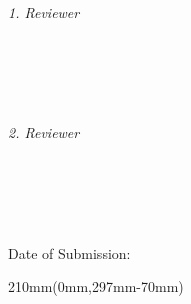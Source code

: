 \begin{titlepage}
	\vfill
	\begin{minipage}[t]{.27\textwidth}
		\raggedleft
		\textit{1. Reviewer}
	\end{minipage}
	\hspace*{15pt}
	\begin{minipage}[t]{.65\textwidth}
		{\Large \thesisFirstReviewer} \\
	  	{\small \thesisFirstReviewerDepartment} \\[-1mm]
		{\small \thesisFirstReviewerUniversity}
	\end{minipage} \\[5mm]
	\begin{minipage}[t]{.27\textwidth}
		\raggedleft
		\textit{2. Reviewer}
	\end{minipage}
	\hspace*{15pt}
	\begin{minipage}[t]{.65\textwidth}
		{\Large \thesisSecondReviewer} \\
	  	{\small \thesisSecondReviewerDepartment} \\[-1mm]
		{\small \thesisSecondReviewerUniversity}
	\end{minipage} \\[10mm]

        \vspace{2cm}
        \begin{flushright}
        Date of Submission: \thesisDate \\
        \end{flushright}

  \begin{textblock*}{210mm}(0mm,297mm-70mm) %
  \end{textblock*}
\end{titlepage}


